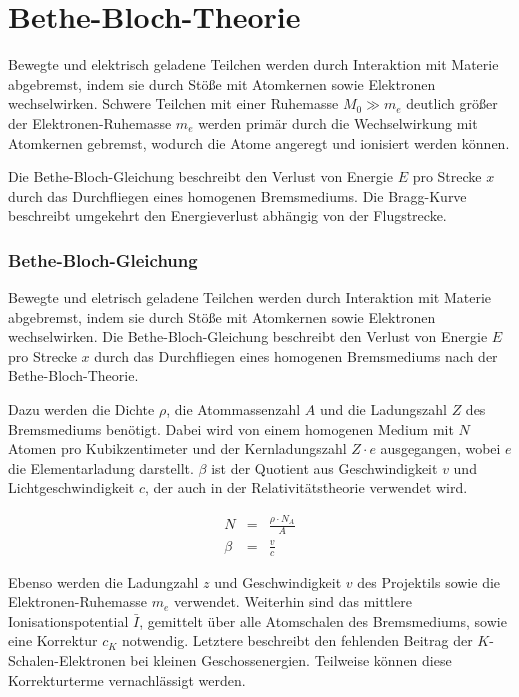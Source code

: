 \documentclass[12pt,a4paper]{scrartcl}
\numberwithin{equation}{section} %
\renewcommand{\[}{} %
\renewcommand{\]}{\noindent} %
\begin{document}
\hypertarget{bethe-bloch-theorie}{%
\section{Bethe-Bloch-Theorie}\label{bethe-bloch-theorie}}

Bewegte und elektrisch geladene Teilchen werden durch Interaktion mit
Materie abgebremst, indem sie durch Stöße mit Atomkernen sowie
Elektronen wechselwirken. Schwere Teilchen mit einer Ruhemasse
$M_0\gg m_e$ deutlich größer der Elektronen-Ruhemasse $m_e$ werden
primär durch die Wechselwirkung mit Atomkernen gebremst, wodurch die
Atome angeregt und ionisiert werden können.

Die Bethe-Bloch-Gleichung beschreibt den Verlust von Energie $E$ pro
Strecke $x$ durch das Durchfliegen eines homogenen Bremsmediums. Die
Bragg-Kurve beschreibt umgekehrt den Energieverlust abhängig von der
Flugstrecke.

\hypertarget{bethe-bloch-gleichung}{%
\subsubsection{Bethe-Bloch-Gleichung}\label{bethe-bloch-gleichung}}

Bewegte und eletrisch geladene Teilchen werden durch Interaktion mit
Materie abgebremst, indem sie durch Stöße mit Atomkernen sowie
Elektronen wechselwirken. Die Bethe-Bloch-Gleichung beschreibt den
Verlust von Energie $E$ pro Strecke $x$ durch das Durchfliegen eines
homogenen Bremsmediums nach der Bethe-Bloch-Theorie.

Dazu werden die Dichte $\rho$, die Atommassenzahl $A$ und die
Ladungszahl $Z$ des Bremsmediums benötigt. Dabei wird von einem
homogenen Medium mit $N$ Atomen pro Kubikzentimeter und der
Kernladungszahl $Z\cdot e$ ausgegangen, wobei $e$ die
Elementarladung darstellt. $\beta$ ist der Quotient aus
Geschwindigkeit $v$ und Lichtgeschwindigkeit $c$, der auch in der
Relativitätstheorie verwendet wird.

\[
\begin{eqnarray}
        N &=& \frac{\rho\cdot N_A}{A} \\
        \beta &=& \frac{v}{c}
\end{eqnarray}
\]

Ebenso werden die Ladungzahl $z$ und Geschwindigkeit $v$ des
Projektils sowie die Elektronen-Ruhemasse $m_e$ verwendet. Weiterhin
sind das mittlere Ionisationspotential $\bar I$, gemittelt über alle
Atomschalen des Bremsmediums, sowie eine Korrektur $c_K$ notwendig.
Letztere beschreibt den fehlenden Beitrag der $K$-Schalen-Elektronen
bei kleinen Geschossenergien. Teilweise können diese Korrekturterme
vernachlässigt werden.
\end{document}
